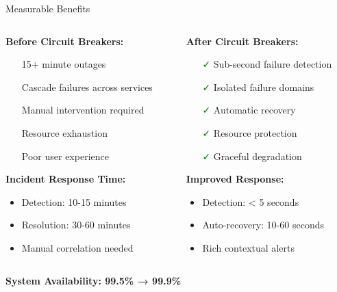 \documentclass[aspectratio=169]{beamer}
\newcommand{\alertred}[1]{\textcolor{red}{#1}}
\newcommand{\successgreen}[1]{\textcolor{green}{#1}}
\begin{document}
\begin{frame}{Measurable Benefits}
    \begin{columns}
        \begin{column}{0.5\textwidth}
            \textbf{Before Circuit Breakers:}
            \begin{itemize}
                \item[\alertred{\faTimes}] 15+ minute outages
                \item[\alertred{\faTimes}] Cascade failures across services
                \item[\alertred{\faTimes}] Manual intervention required
                \item[\alertred{\faTimes}] Resource exhaustion
                \item[\alertred{\faTimes}] Poor user experience
            \end{itemize}
            
            \vspace{0.5cm}
            \textbf{Incident Response Time:}
            \begin{itemize}
                \item Detection: 10-15 minutes
                \item Resolution: 30-60 minutes
                \item Manual correlation needed
            \end{itemize}
        \end{column}
        \begin{column}{0.5\textwidth}
            \textbf{After Circuit Breakers:}
            \begin{itemize}
                \item[\successgreen{\faCheck}] Sub-second failure detection
                \item[\successgreen{\faCheck}] Isolated failure domains
                \item[\successgreen{\faCheck}] Automatic recovery
                \item[\successgreen{\faCheck}] Resource protection
                \item[\successgreen{\faCheck}] Graceful degradation
            \end{itemize}
            
            \vspace{0.5cm}
            \textbf{Improved Response:}
            \begin{itemize}
                \item Detection: < 5 seconds
                \item Auto-recovery: 10-60 seconds
                \item Rich contextual alerts
            \end{itemize}
        \end{column}
    \end{columns}
    
    \vspace{0.5cm}
    \begin{center}
        \textbf{System Availability: 99.5\% → 99.9\%}
    \end{center}
\end{frame}
\end{document}
